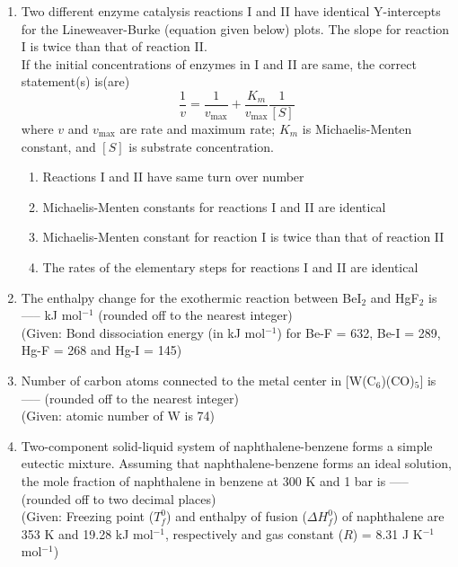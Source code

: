 \documentclass[journal,12pt,onecolumn]{IEEEtran}
\theoremstyle{remark}
\begin{document}
\begin{enumerate}
\item Two different enzyme catalysis reactions I and II have identical Y-intercepts for the Lineweaver-Burke (equation given below) plots. The slope for reaction I is twice than that of reaction II. \\
If the initial concentrations of enzymes in I and II are same, the correct statement(s) is(are) \\
\[
\frac{1}{v} = \frac{1}{v_{\max}} + \frac{K_m}{v_{\max}} \frac{1}{[S]}
\]
where $v$ and $v_{\max}$ are rate and maximum rate; $K_m$ is Michaelis-Menten constant, and $[S]$ is substrate concentration.
\begin{multicols}{2}
\begin{enumerate}
\item Reactions I and II have same turn over number
\item Michaelis-Menten constants for reactions I and II are identical
\item Michaelis-Menten constant for reaction I is twice than that of reaction II
\item The rates of the elementary steps for reactions I and II are identical
\end{enumerate}
\end{multicols}




\item The enthalpy change for the exothermic reaction between BeI$_2$ and HgF$_2$ is----- kJ mol$^{-1}$ (rounded off to the nearest integer) \\
(Given: Bond dissociation energy (in kJ mol$^{-1}$) for Be-F = 632, Be-I = 289, Hg-F = 268 and Hg-I = 145)

\item Number of carbon atoms connected to the metal center in [W(C$_6$)(CO)$_5$] is ----- (rounded off to the nearest integer) \\
(Given: atomic number of W is 74)

\item Two-component solid-liquid system of naphthalene-benzene forms a simple eutectic mixture. Assuming that naphthalene-benzene forms an ideal solution, the mole fraction of naphthalene in benzene at 300 K and 1 bar is ----- (rounded off to two decimal places) \\
(Given: Freezing point ($T_f^0$) and enthalpy of fusion ($\Delta H_f^0$) of naphthalene are 353 K and 19.28 kJ mol$^{-1}$, respectively and gas constant ($R$) = 8.31 J K$^{-1}$ mol$^{-1}$)


\end{enumerate}
\end{document}

